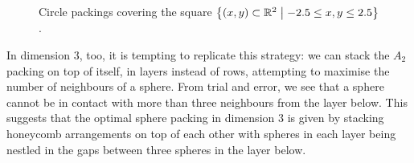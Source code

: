 \begin{figure}[htb]
    \centering
    \begin{subfigure}{0.48\linewidth}
        \centering
        \label{Ch1:Subfig:Z2_lattice_packing_2D}
    \end{subfigure}
    \begin{subfigure}{0.48\linewidth}
        \centering
        \label{Ch1:Subfig:A2_lattice_packing_2D}
    \end{subfigure}
    \caption{Circle packings covering the square $\left\{ \left( x, y \right) \subset \mathbb{R}^2 \; \middle\vert \; -2.5 \leq x, y \leq 2.5 \right\}$.}
    \label{Ch1:Fig:Circle_Packings_2D}
\end{figure}

In dimension $3$, too, it is tempting to replicate this strategy: we can stack the $A_2$ packing on top of itself, in layers instead of rows, attempting to maximise the number of neighbours of a sphere. From trial and error, we see that a sphere cannot be in contact with more than three neighbours from the layer below. This suggests that the optimal sphere packing in dimension $3$ is given by stacking honeycomb arrangements on top of each other with spheres in each layer being nestled in the gaps between three spheres in the layer below.

